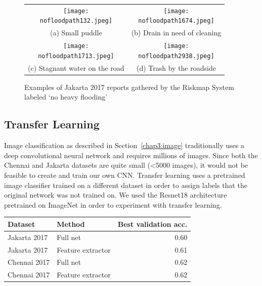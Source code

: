 \begin{figure}[hp]
  \captionsetup{justification=centering}
  \caption{Examples of Jakarta 2017 reports gathered by the Riskmap System
  labeled `no heavy flooding'}\label{fig:id_no_flood_sample}
  \begin{tabular}{cc}
    \texttt{[image: \\nofloodpath132.jpeg]} &
    \texttt{[image: \\nofloodpath1674.jpeg]} \\
      (a) Small puddle & (b) Drain in need of cleaning \\[6pt]
       \texttt{[image: \\nofloodpath1713.jpeg]} &
       \texttt{[image: \\nofloodpath2938.jpeg]} \\
       (c) Stagnant water on the road & (d) Trash by the roadside \\[6pt]
  \end{tabular}
\end{figure}

\newpage

\subsection{Transfer Learning}
Image classification as described in Section~\ref{chap3:image} traditionally uses a
deep convolutional neural network and requires millions of images. Since both the
Chennai and Jakarta datasets are quite small (<5000 images), it would not be
feasible to create and train our own CNN. Transfer learning uses a pretrained
image classifier trained on a different dataset in order to assign labels that the
original network was not trained on.
We used the Resnet18 architecture pretrained on ImageNet in order to
experiment with transfer learning.

\begin{table}
\centering
\begin{tabular}{llr}\label{table:transfer_learning}
\toprule
      Dataset &             Method &  Best validation acc. \\
\hline
 Jakarta 2017 &           Full net &                  0.60 \\
\midrule
 Jakarta 2017 &  Feature extractor &                  0.61 \\
 Chennai 2017 &           Full net &                  0.62 \\
 Chennai 2017 &  Feature extractor &                  0.62 \\
\bottomrule
\end{tabular}
\end{table}


